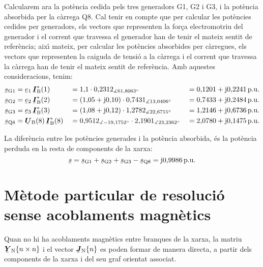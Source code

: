 \begin{exemple}
Calcularem ara la pot\`{e}ncia cedida pels tres generadors G1, G2 i G3, i la pot\`{e}ncia absorbida per la c\`{a}rrega Q8. Cal tenir en compte que per calcular les pot\`{e}ncies cedides per generadors, els vectors que representen la for\c{c}a electromotriu del generador i el corrent que travessa el generador han de tenir el mateix sentit de refer\`{e}ncia; aix\'{\i} mateix, per calcular les pot\`{e}ncies absorbides per c\`{a}rregues, els vectors que representen la caiguda de tensi\'{o} a la c\`{a}rrega i el corrent que travessa la c\`{a}rrega han de tenir el mateix sentit de refer\`{e}ncia. Amb aquestes consideracions, tenim:
\begin{alignat*}{3}
   \cmplx{s}\ped{G1} &= \cmplx{e}\ped{1} \, \mcmplx{I}\ped{B}^*(1) &&= 1{,}1 \cdot
    0{,}2312_{\measuredangle 61{,}8063\degree} &&= 0{,}1201 + \ju 0{,}2241 \unit{p.u.} \\
   \cmplx{s}\ped{G2} &= \cmplx{e}\ped{2} \, \mcmplx{I}\ped{B}^*(2) &&=
   (1{,}05 + \ju 0{,}10) \cdot 0{,}7431_{\measuredangle 13{,}0406\degree} &&=
   0{,}7433 + \ju 0{,}2484\unit{p.u.}   \\
   \cmplx{s}\ped{G3} &= \cmplx{e}\ped{3} \, \mcmplx{I}\ped{B}^*(3) &&=
   (1{,}08 + \ju 0{,}12) \cdot 1{,}2782_{\measuredangle 22{,}6715\degree} &&=
   1{,}2146 + \ju 0{,}6736\unit{p.u.}   \\
   \cmplx{s}\ped{Q8} &= \mcmplx{U}\ped{B}(8) \, \mcmplx{I}\ped{B}^*(8) &&=
   0{,}9512_{\measuredangle -19{,}1752\degree} \cdot 2{,}1901_{\measuredangle          23{,}2362\degree}     &&= 2{,}0780 + \ju 0{,}1475\unit{p.u.}
\end{alignat*}

La difer\`{e}ncia entre les pot\`{e}ncies generades i la pot\`{e}ncia absorbida, \'{e}s la pot\`{e}ncia perduda en la resta de components de la xarxa:
\[
   \cmplx{s} = \cmplx{s}\ped{G1} + \cmplx{s}\ped{G2} + \cmplx{s}\ped{G3} -
   \cmplx{s}\ped{Q8} = \ju 0{,}9986\unit{p.u.}
\]
\end{exemple}


\section{M\`{e}tode particular de resoluci\'{o} sense acoblaments magn\`{e}tics}

Quan no hi ha acoblaments magn\`{e}tics entre branques de la xarxa, la matriu $\mcmplx{Y}\ped{N}\{n \times n\}$ i el vector $\mcmplx{J}\ped{N}\{n\}$ es poden formar de manera directa, a partir dels components de la xarxa i del seu graf orientat associat.

